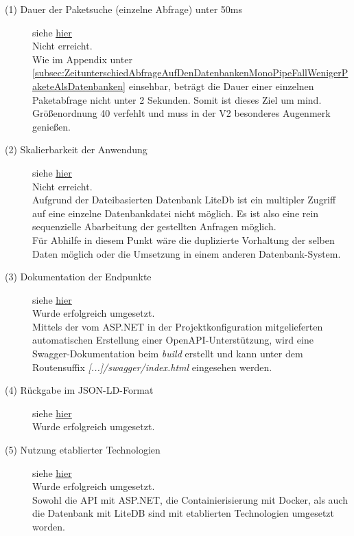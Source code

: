     \begin{description}
        \item[(1) Dauer der Paketsuche (einzelne Abfrage) unter 50ms] siehe \hyperref[nf:one]{\underline{hier}} \hfill \\
            Nicht erreicht.
            \\
            Wie im Appendix unter \ref{subsec:ZeitunterschiedAbfrageAufDenDatenbankenMonoPipeFallWenigerPaketeAlsDatenbanken} einsehbar, beträgt die Dauer einer einzelnen Paketabfrage nicht unter 2 Sekunden.
            Somit ist dieses Ziel um mind. Größenordnung 40 verfehlt und muss in der V2 besonderes Augenmerk genießen.
        \item[(2) Skalierbarkeit der Anwendung] siehe \hyperref[nf:two]{\underline{hier}} \hfill \\
            Nicht erreicht.
            \\
            Aufgrund der Dateibasierten Datenbank LiteDb ist ein multipler Zugriff auf eine einzelne Datenbankdatei nicht möglich. Es ist also eine rein sequenzielle Abarbeitung der gestellten Anfragen möglich.
            \\
            Für Abhilfe in diesem Punkt wäre die duplizierte Vorhaltung der selben Daten möglich oder die Umsetzung in einem anderen Datenbank-System.
        \item[(3) Dokumentation der Endpunkte] siehe \hyperref[nf:three]{\underline{hier}} \hfill \\
            Wurde erfolgreich umgesetzt.
            \\
            Mittels der vom ASP.NET in der Projektkonfiguration mitgelieferten automatischen Erstellung einer OpenAPI-Unterstützung, wird eine Swagger-Dokumentation beim \textit{build} erstellt und kann unter dem Routensuffix \textit{[...]/swagger/index.html} eingesehen werden.
        \item[(4) Rückgabe im \acs{JSON-LD}-Format] siehe \hyperref[nf:four]{\underline{hier}} \hfill \\
            Wurde erfolgreich umgesetzt.
        \item[(5) Nutzung etablierter Technologien] siehe \hyperref[nf:five]{\underline{hier}} \hfill \\
            Wurde erfolgreich umgesetzt.
            \\
            Sowohl die \ac{API} mit ASP.NET, die Containierisierung mit Docker, als auch die Datenbank mit LiteDB sind mit etablierten Technologien umgesetzt worden.
    \end{description}

